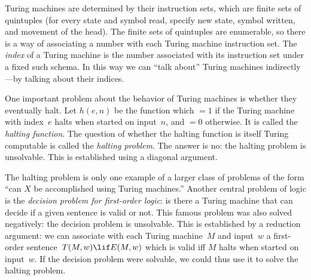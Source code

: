 Turing machines are determined by their instruction sets, which are
finite sets of quintuples (for every state and symbol read, specify
new state, symbol written, and movement of the head). The finite sets
of quintuples are enumerable, so there is a way of associating a
number with each Turing machine instruction set. The \emph{index} of
a Turing machine is the number associated with its instruction set
under a fixed such schema. In this way we can ``talk about'' Turing
machines indirectly---by talking about their indices.

One important problem about the behavior of Turing machines is whether
they eventually halt. Let $h(e, n)$ be the function which $= 1$ if the
Turing machine with index~$e$ halts when started on input~$n$, and
$=0$ otherwise. It is called the \emph{halting function}. The question
of whether the halting function is itself Turing computable is called
the \emph{halting problem}. The answer is no: the halting problem is
unsolvable. This is established using a diagonal argument.

The halting problem is only one example of a larger class of problems
of the form ``can $X$ be accomplished using Turing machines.'' Another
central problem of logic is the \emph{decision problem for first-order
  logic}: is there a Turing machine that can decide if a given
sentence is valid or not. This famous problem was also solved
negatively: the decision problem is unsolvable. This is established by
a reduction argument: we can associate with each Turing machine~$M$
and input~$w$ a first-order sentence~$T(M, w) \lif E(M, w)$ which is
valid iff $M$ halts when started on input~$w$. If the decision problem
were solvable, we could thus use it to solve the halting problem.
